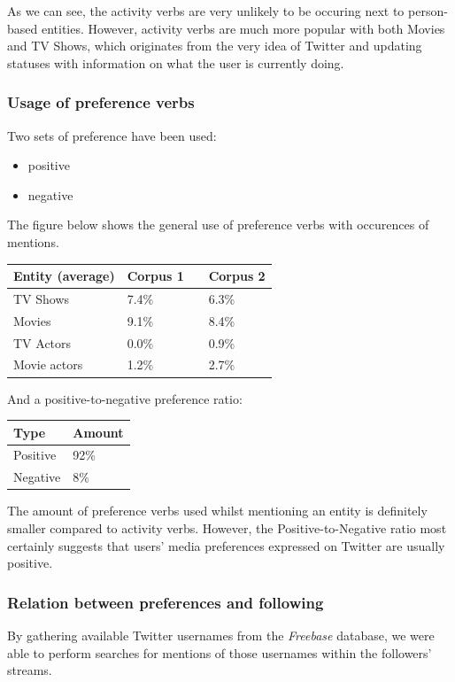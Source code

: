 \documentclass{article}
\begin{document}
As we can see, the activity verbs are very unlikely to be occuring next to
person-based entities. However, activity verbs are much more popular with both
Movies and TV Shows, which originates from the very idea of Twitter and
updating statuses with information on what the user is currently doing.

\subsubsection{Usage of preference verbs}
Two sets of preference have been used:
\begin{itemize}
\item positive
\item negative
\end{itemize}

The figure below shows the general use of preference verbs with occurences of
mentions.

\begin{center}
  \begin{tabular}{ | p{4cm} | p{2cm} | p{1cm}| p{2cm} | } \hline
    Entity (average) & Corpus 1 & & Corpus 2 \\ \hline
    TV Shows & 7.4\% & & 6.3\% \\ \hline
    Movies & 9.1\% & & 8.4\% \\ \hline
    TV Actors & 0.0\% & & 0.9\% \\ \hline
    Movie actors & 1.2\% & & 2.7\% \\ \hline
  \end{tabular}
\end{center}

And a positive-to-negative preference ratio:

\begin{center}
  \begin{tabular}{ | p{3cm}| p{2cm} | } \hline
    Type & Amount \\ \hline
    Positive & 92\% \\ \hline
    Negative & 8\% \\ \hline
  \end{tabular}
\end{center}

The amount of preference verbs used whilst mentioning an entity is definitely
smaller compared to activity verbs. However, the Positive-to-Negative ratio most
certainly suggests that users' media preferences expressed on Twitter are
usually positive.

\subsubsection{Relation between preferences and following}
By gathering available Twitter usernames from the \textit{Freebase} database, 
we were able to perform searches for mentions of those usernames within the followers' streams.
\end{document}
